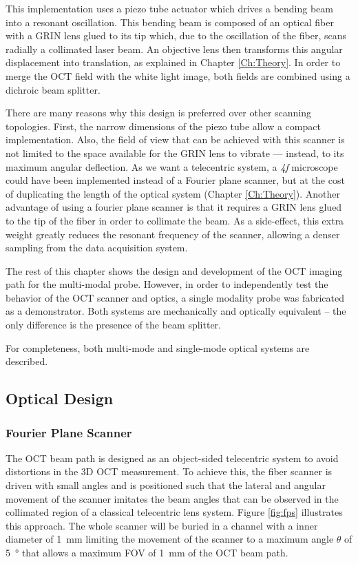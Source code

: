 This implementation uses a piezo tube actuator which drives a bending beam into a resonant oscillation. This bending beam is composed of an optical fiber with a GRIN lens glued to its tip which, due to the oscillation of the fiber, scans radially a collimated laser beam. An objective lens then transforms this angular displacement into translation, as explained in Chapter \ref{Ch:Theory}. In order to merge the OCT field with the white light image, both fields are combined using a dichroic beam splitter.

There are many reasons why this design is preferred over other scanning topologies. First, the narrow dimensions of the piezo tube allow a compact implementation. Also, the field of view that can be achieved with this scanner is not limited to the space available for the GRIN lens to vibrate --- instead, to its maximum angular deflection. As we want a telecentric system, a \textit{4f} microscope could have been implemented instead of a Fourier plane scanner, but at the cost of duplicating the length of the optical system (Chapter \ref{Ch:Theory}). Another advantage of using a fourier plane scanner is that it requires a GRIN lens glued to the tip of the fiber in order to collimate the beam. As a side-effect, this extra weight greatly reduces the resonant frequency of the scanner, allowing a denser sampling from the data acquisition system. 

The rest of this chapter shows the design and development of the OCT imaging path for the multi-modal probe. However, in order to independently test the behavior of the OCT scanner and optics, a single modality probe was fabricated as a demonstrator. Both systems are mechanically and optically equivalent -- the only difference is the presence of the beam splitter. 

For completeness, both multi-mode and single-mode optical systems are described.


\newpage
\subsection{Optical Design}

\subsubsection*{Fourier Plane Scanner}
The OCT beam path is designed as an object-sided telecentric system to avoid distortions in the 3D OCT measurement. To achieve this, the fiber scanner is driven with small angles and is positioned such that the lateral and angular movement of the scanner imitates the beam angles that can be observed in the collimated region of a classical telecentric lens system. Figure \ref{fig:fps} illustrates this approach. The whole scanner will be buried in a channel with a inner diameter of \SI{1}{\milli\meter} limiting the movement of the scanner to a maximum angle $\theta$ of \SI{5}{\degree} that allows a maximum FOV of \SI{1}{\milli\meter} of the OCT beam path.



